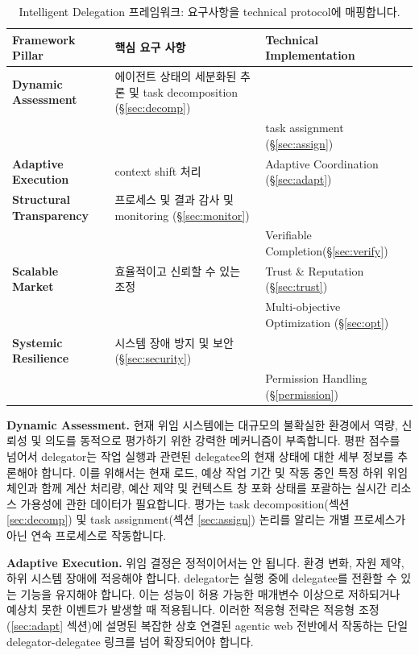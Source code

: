\documentclass[11pt, a4paper, twocolumn, copyright, goog]{google}
\begin{document}
\begin{table}[t]
\caption{Intelligent Delegation 프레임워크: 요구사항을 technical protocol에 매핑합니다.}
\label{tab:framework_mapping}
\centering
\begin{tabular*}{\textwidth}{@{\extracolsep{\fill}}lll@{}}
\toprule
\textbf{Framework Pillar} & \textbf{핵심 요구 사항} & \textbf{Technical Implementation} \\ \midrule
\textbf{Dynamic Assessment} & 에이전트 상태의 세분화된 추론 및 task decomposition (\S\ref{sec:decomp}) \\
 & & task assignment (\S\ref{sec:assign}) \\ \midrule
\textbf{Adaptive Execution} & context shift 처리 & Adaptive Coordination (\S\ref{sec:adapt}) \\ \midrule
\textbf{Structural Transparency} & 프로세스 및 결과 감사 및 monitoring (\S\ref{sec:monitor}) \\
 & & Verifiable Completion(\S\ref{sec:verify}) \\ \midrule
\textbf{Scalable Market} & 효율적이고 신뢰할 수 있는 조정 & Trust \& Reputation (\S\ref{sec:trust}) \\
 & & Multi-objective Optimization (\S\ref{sec:opt}) \\ \midrule
\textbf{Systemic Resilience} & 시스템 장애 방지 및 보안 (\S\ref{sec:security}) \\
& & Permission Handling (\S\ref{permission}) \\ \bottomrule
\end{tabular*}
\end{table}

\textbf{Dynamic Assessment.} 현재 위임 시스템에는 대규모의 불확실한 환경에서 역량, 신뢰성 및 의도를 동적으로 평가하기 위한 강력한 메커니즘이 부족합니다. 평판 점수를 넘어서 delegator는 작업 실행과 관련된 delegatee의 현재 상태에 대한 세부 정보를 추론해야 합니다. 이를 위해서는 현재 로드, 예상 작업 기간 및 작동 중인 특정 하위 위임 체인과 함께 계산 처리량, 예산 제약 및 컨텍스트 창 포화 상태를 포괄하는 실시간 리소스 가용성에 관한 데이터가 필요합니다. 평가는 task decomposition(섹션 \ref{sec:decomp}) 및 task assignment(섹션 \ref{sec:assign}) 논리를 알리는 개별 프로세스가 아닌 연속 프로세스로 작동합니다.

\textbf{Adaptive Execution.} 위임 결정은 정적이어서는 안 됩니다. 환경 변화, 자원 제약, 하위 시스템 장애에 적응해야 합니다. delegator는 실행 중에 delegatee를 전환할 수 있는 기능을 유지해야 합니다. 이는 성능이 허용 가능한 매개변수 이상으로 저하되거나 예상치 못한 이벤트가 발생할 때 적용됩니다. 이러한 적응형 전략은 적응형 조정(\ref{sec:adapt} 섹션)에 설명된 복잡한 상호 연결된 agentic web 전반에서 작동하는 단일 delegator-delegatee 링크를 넘어 확장되어야 합니다.
\end{document}
